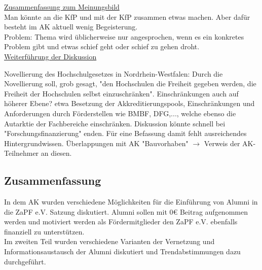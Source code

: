     \underline{Zusammenfassung zum Meinungsbild} \\
    Man könnte an die KfP und mit der KfP zusammen etwas machen. Aber dafür besteht im AK aktuell wenig Begeisterung. \\

    Problem: Thema wird üblicherweise nur angesprochen, wenn es ein konkretes Problem gibt und etwas schief geht oder schief zu gehen droht. \\

    \underline{Weiterführung der Diskussion}
    \begin{outline}
      \1 Novellierung des Hochschulgesetzes in Nordrhein-Westfalen: Durch die Novellierung soll, grob gesagt, "den Hochschulen die Freiheit gegeben werden, die Freiheit der Hochschulen selbst einzuschränken".
      \1 Einschränkungen auch auf höherer Ebene? etwa Besetzung der Akkreditierungspools, Einschränkungen und Anforderungen durch Förderstellen wie BMBF, DFG,..., welche ebenso die Autarktie der Fachbereiche einschränken.
        \2 Diskussion könnte schnell bei "Forschungsfinanzierung" enden.
        \2 Für eine Befassung damit fehlt ausreichendes Hintergrundwissen.
      \1 Überlappungen mit AK "Bauvorhaben" $\rightarrow$ Verweis der AK-Teilnehmer an diesen.
    \end{outline}

  \subsection*{Zusammenfassung}
    In dem AK wurden verschiedene Möglichkeiten für die Einführung von Alumni in die ZaPF e.V. Satzung diskutiert. Alumni sollen mit $0 \euro$ Beitrag aufgenommen werden und motiviert werden als Fördermitglieder den ZaPF e.V. ebenfalls finanziell zu unterstützen. \\
    Im zweiten Teil wurden verschiedene Varianten der Vernetzung und Informationsaustausch der Alumni diskutiert und Trendabstimmungen dazu durchgeführt.
